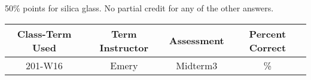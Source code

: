 \begin{rubric}

50\% points for silica glass. No partial credit for any of the other answers.

\end{rubric}

\begin{outcomes}
	\newline \newline
		\begin{tabular}{cccc}
			\hline\hline
			Class-Term Used & Term Instructor & Assessment & Percent Correct\\
			\hline
			201-W16 & Emery & Midterm3 & \%\\    %
			\hline
		\end{tabular}
\end{outcomes}

\begin{comments}
	
\end{comments}